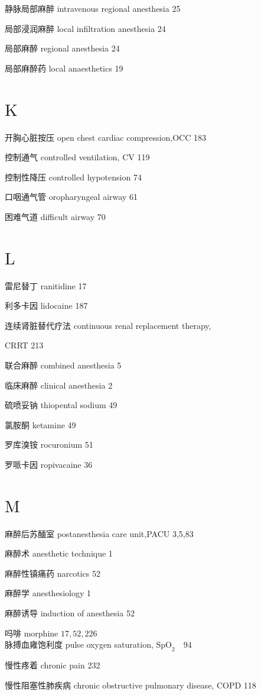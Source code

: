 \documentclass[10pt]{article}
\begin{document}
静脉局部麻醉 intravenous regional anesthesia 25

局部浸润麻醉 local infiltration anesthesia 24

局部麻醉 regional anesthesia 24

局部麻醉药 local anaesthetics 19

\section*{$\mathrm{K}$}
开胸心脏按压 open chest cardiac compression,OCC 183

控制通气 controlled ventilation, CV 119

控制性降压 controlled hypotension 74

口咽通气管 oropharyngeal airway 61

困难气道 difficult airway 70

\section*{$\mathrm{L}$}
雷尼替丁 ranitidine 17

利多卡因 lidocaine 187

连续肾脏替代疗法 continuous renal replacement therapy,

CRRT 213

联合麻醉 combined anesthesia 5

临床麻醉 clinical anesthesia 2

硫喷妥钠 thiopental sodium 49

氯胺酮 ketamine 49

罗库溴铵 rocuronium 51

罗哌卡因 ropivacaine 36

\section*{$\mathrm{M}$}
麻醉后苏䤄室 postanesthesia care unit,PACU 3,5,83

麻醉术 anesthetic technique 1

麻醉性镇痛药 narcotics 52

麻醉学 anesthesiology 1

麻醉诱导 induction of anesthesia 52

吗啡 morphine $17,52,226$\\
脉搏血雍饱利度 pulse oxygen saturation, $\mathrm{SpO}_{2} \quad 94$

慢性疼着 chronic pain 232

慢性阻塞性肺疾病 chronic obstructive pulmonary disease, COPD 118
\end{document}
